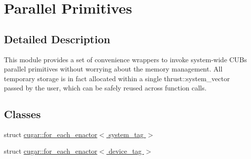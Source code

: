\hypertarget{group___primitives}{}\section{Parallel Primitives}
\label{group___primitives}


\subsection{Detailed Description}
This module provides a set of convenience wrappers to invoke system-\/wide C\+UB\textquotesingle{}s parallel primitives without worrying about the memory management. All temporary storage is in fact allocated within a single thrust\+::system\+\_\+vector passed by the user, which can be safely reused across function calls. \subsection*{Classes}
\begin{DoxyCompactItemize}
\item 
struct \hyperlink{structcugar_1_1for__each__enactor}{cugar\+::for\+\_\+each\+\_\+enactor$<$ system\+\_\+tag $>$}
\item 
struct \hyperlink{structcugar_1_1for__each__enactor_3_01device__tag_01_4}{cugar\+::for\+\_\+each\+\_\+enactor$<$ device\+\_\+tag $>$}
\end{DoxyCompactItemize}

